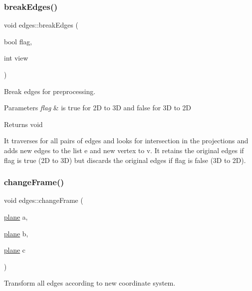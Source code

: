 \mbox{\label{classedges_ae6ced63c681679ef31af8be2542a94b2}} 
\subsubsection{\texorpdfstring{break\+Edges()}{breakEdges()}}
{\footnotesize\ttfamily void edges\+::break\+Edges (\begin{DoxyParamCaption}\item[{bool}]{flag,  }\item[{int}]{view }\end{DoxyParamCaption})}



Break edges for preprocessing. 


\begin{DoxyParams}{Parameters}
{\em flag} & is true for 2D to 3D and false for 3D to 2D \\
\hline
\end{DoxyParams}
\begin{DoxyReturn}{Returns}
void
\end{DoxyReturn}
It traverses for all pairs of edges and looks for intersection in the projections and adds new edges to the list e and new vertex to v. It retains the original edges if flag is true (2D to 3D) but discards the original edges if flag is false (3D to 2D). \mbox{\label{classedges_abd3214d701efbea5748b571d8ed4ae4f}} 
\subsubsection{\texorpdfstring{change\+Frame()}{changeFrame()}}
{\footnotesize\ttfamily void edges\+::change\+Frame (\begin{DoxyParamCaption}\item[{\mbox{\hyperlink{structplane}{plane}}}]{a,  }\item[{\mbox{\hyperlink{structplane}{plane}}}]{b,  }\item[{\mbox{\hyperlink{structplane}{plane}}}]{c }\end{DoxyParamCaption})}



Transform all edges according to new coordinate system. 


